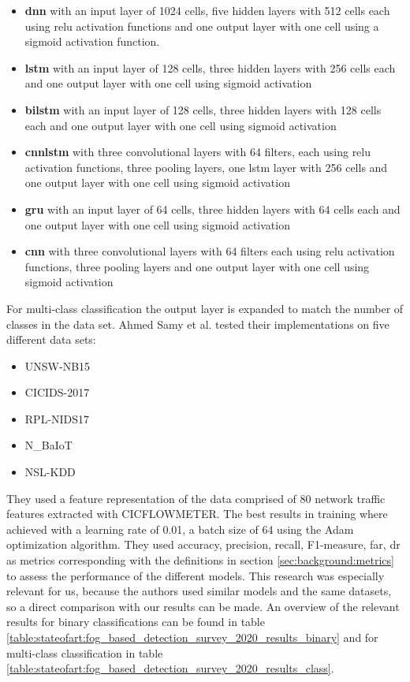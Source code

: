 \begin{itemize}
	\item \textbf{\gls{dnn}} with an input layer of 1024 cells, five hidden layers with 512 cells each using \gls{relu} activation functions and one output layer with one cell using a sigmoid activation function.
	\item \textbf{\gls{lstm}} with an input layer of 128 cells, three hidden layers with 256 cells each and one output layer with one cell using sigmoid activation 
	\item \textbf{\gls{bilstm}} with an input layer of 128 cells, three hidden layers with 128 cells each and one output layer with one cell using sigmoid activation
	\item \textbf{\gls{cnnlstm}} with three convolutional layers with 64 filters, each using \gls{relu} activation functions, three pooling layers, one \gls{lstm} layer with 256 cells and one output layer with one cell using sigmoid activation
	\item \textbf{\gls{gru}} with an input layer of 64 cells, three hidden layers with 64 cells each and one output layer with one cell using sigmoid activation
	\item \textbf{\gls{cnn}} with three convolutional layers with 64 filters each using \gls{relu} activation functions, three pooling layers and one output layer with one cell using sigmoid activation
\end{itemize}

For multi-class classification the output layer is expanded to match the number of classes in the data set. Ahmed Samy et al. tested their implementations on five different data sets:

\begin{itemize}
	\item UNSW-NB15 \cite{unsw_nb15}
	\item CICIDS-2017 \cite{cic_ids_2017}
	\item RPL-NIDS17 \cite{rpl_nids17}
	\item N\_BaIoT \cite{n_baiot}
	\item NSL-KDD \cite{nsl_kdd}
\end{itemize}

They used a feature representation of the data comprised of 80 network traffic features extracted with CICFLOWMETER. The best results in training where achieved with a learning rate of 0.01, a batch size of 64 using the Adam optimization algorithm. They used accuracy, precision, recall, F1-measure, \gls{far}, \gls{dr} as metrics corresponding with the definitions in section \ref{sec:background:metrics} to assess the performance of the different models. This research was especially relevant for us, because the authors used similar models and the same datasets, so a direct comparison with our results can be made. An overview of the relevant results for binary classifications can be found in table \ref{table:stateofart:fog_based_detection_survey_2020_results_binary} and for multi-class classification in table \ref{table:stateofart:fog_based_detection_survey_2020_results_class}.

